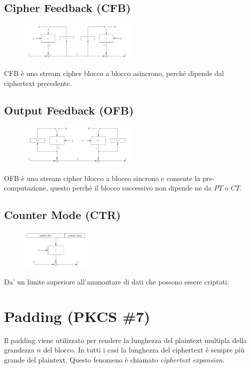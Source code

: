 \documentclass[a4paper,12pt]{article}
\begin{document}
\subsection{Cipher Feedback (CFB)}
\begin{figure}[H]
  \centering
  \includegraphics[width=0.5\textwidth]{img/cfb}
\end{figure}
CFB è uno stream cipher blocco a blocco asincrono, perché dipende dal ciphertext precedente.

\subsection{Output Feedback (OFB)}
\begin{figure}[H]
  \centering
  \includegraphics[width=0.5\textwidth]{img/ofb}
\end{figure}
OFB è uno stream cipher blocco a blocco sincrono e consente la pre-computazione, questo perché il blocco successivo non dipende ne da $PT$ o $CT$.

\subsection{Counter Mode (CTR)}
\begin{figure}[H]
  \centering
  \includegraphics[width=0.3\textwidth]{img/ctr}
\end{figure}
Da' un limite superiore all'ammontare di dati che possono essere criptati.

\section{Padding (PKCS \#7)}
Il padding viene utilizzato per rendere la lunghezza del plaintext multipla della grandezza $n$ del blocco. In tutti i casi la lunghezza del ciphertext è sempre più grande del plaintext. Questo fenomeno è chiamato \textit{ciphertext expansion}.
\end{document}
